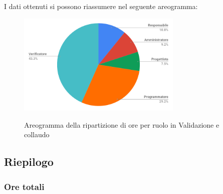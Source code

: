 \pagebreak
I dati ottenuti si possono riassumere nel seguente areogramma:
\begin{figure}[H] 
			\centering 
				\includegraphics[width=0.7\textwidth]{res/images/areogramma_validazione.png}\\
				\caption{Areogramma della ripartizione di ore per ruolo in Validazione e collaudo}
			\label{AreogrammaValidazione}
\end{figure}


\subsection{Riepilogo}
\subsubsection{Ore totali}

